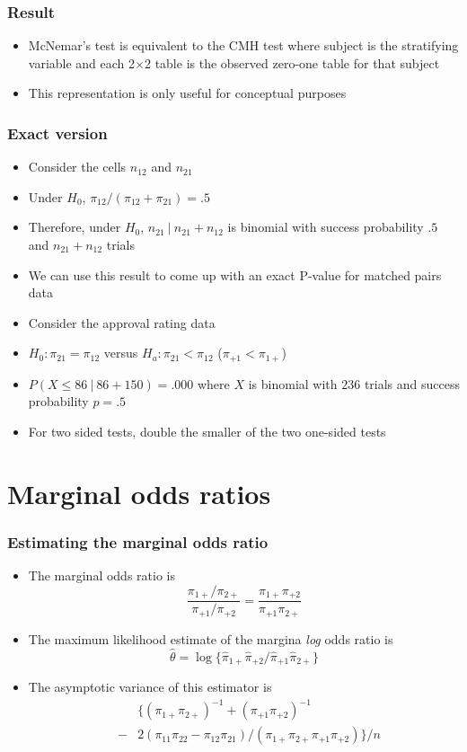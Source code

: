 \documentclass[aspectratio=169]{beamer}
\begin{document}
\begin{frame}\frametitle{Result}
\begin{itemize}
\item McNemar's test is equivalent to the CMH test where subject is
  the stratifying variable and each 2$\times$2 table is the observed
  zero-one table for that subject
\item This representation is only useful for conceptual purposes
\end{itemize}
\end{frame}


\begin{frame}\frametitle{Exact version}
\begin{itemize}
\item Consider the cells $n_{12}$ and $n_{21}$
\item Under $H_0$, $\pi_{12} / (\pi_{12} + \pi_{21}) = .5$
\item Therefore, under $H_0$, $n_{21} ~|~ n_{21} + n_{12}$ is binomial
  with success probability $.5$ and $n_{21} + n_{12}$ trials
\item We can use this result to come up with an exact P-value for
  matched pairs data
\end{itemize}
\end{frame}

\begin{frame}
\begin{itemize}
\item Consider the approval rating data
\item $H_0 : \pi_{21} = \pi_{12}$ versus $H_a : \pi_{21} < \pi_{12}$ ($\pi_{+1} < \pi_{1+}$)
\item $P(X \leq 86 ~|~ 86 + 150) = .000$ where $X$ is binomial with
  $236$ trials and success probability $p = .5$
\item For two sided tests, double the smaller of the two one-sided
  tests
\end{itemize}
\end{frame}


\section{Marginal odds ratios}
\begin{frame}\frametitle{Estimating the marginal odds ratio}
\begin{itemize}
\item The marginal odds ratio is
$$
\frac{\pi_{1+}/\pi_{2+}}{\pi_{+1}/\pi_{+2}}
  = \frac{\pi_{1+}\pi_{+2}}{\pi_{+1}\pi_{2+}}
$$
\item The maximum likelihood estimate of the margina {\em log} odds ratio is
$$\hat \theta = \log\{\hat \pi_{1+} \hat \pi_{+2}/ \hat \pi_{+1} \hat \pi_{2+}\}$$
\item The asymptotic variance of this estimator is
  \begin{eqnarray*}
&   & \{ (\pi_{1+}\pi_{2+})^{-1} + (\pi_{+1}\pi_{+2})^{-1} \\
& - & 2(\pi_{11}\pi_{22} - \pi_{12}\pi_{21})/ (\pi_{1+}\pi_{2+}\pi_{+1}\pi_{+2})\}/n
  \end{eqnarray*}
\end{itemize}
\end{frame}
\end{document}
